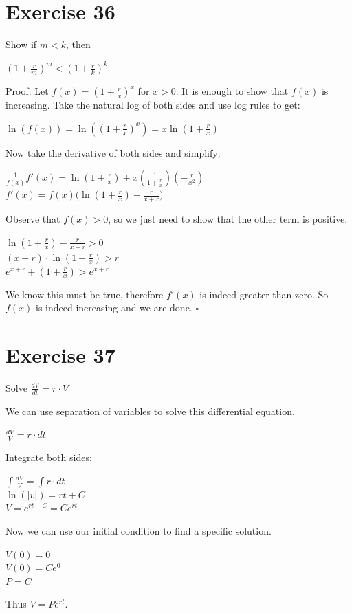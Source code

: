 \documentclass{article}
\begin{document}
\section*{Exercise 36}
Show if $m < k$, then
\begin{center}
    $(1 + \frac{r}{m})^m < (1 + \frac{r}{k})^k$
\end{center}
\begin{flushleft}
    Proof: Let $f(x) = (1 + \frac{r}{x})^x$ for $x > 0$. It is enough to show that $f(x)$ is increasing. Take the natural log of both sides and use log rules to get:
    \begin{center}
        $\ln(f(x)) = \ln((1 + \frac{r}{x})^x) = x\ln(1 + \frac{r}{x})$
    \end{center}
    Now take the derivative of both sides and simplify:
    \begin{center}
        $\frac{1}{f(x)} f'(x) = \ln(1 + \frac{r}{x}) + x(\frac{1}{1+\frac{r}{x}})(-\frac{r}{x^2})$ \\
        $f'(x) = f(x) \big(\ln(1 + \frac{r}{x}) - \frac{r}{x+r}\big)$
    \end{center}
    Observe that $f(x) > 0$, so we just need to show that the other term is positive.
    \begin{center}
        $\ln(1 + \frac{r}{x}) - \frac{r}{x+r} > 0$ \\
        $(x + r) \cdot \ln(1 + \frac{r}{x}) > r$ \\
        $e^{x+r} + (1 + \frac{r}{x}) > e^{x+r}$
    \end{center}
    We know this must be true, therefore $f'(x)$ is indeed greater than zero. So $f(x)$ is indeed increasing and we are done. $\square$
\end{flushleft}

\section*{Exercise 37}
Solve $\frac{dV}{dt} = r \cdot V$
\begin{flushleft}
    We can use separation of variables to solve this differential equation.
    \begin{center}
        $\frac{dV}{V} = r \cdot dt$
    \end{center}
    Integrate both sides:
    \begin{center}
        $\int \frac{dV}{V} = \int r \cdot dt$ \\
        $\ln(|v|) = rt + C$ \\
        $V = e^{rt + C} = Ce^{rt}$
    \end{center}
    Now we can use our initial condition to find a specific solution.
    \begin{center}
        $V(0) = 0$ \\
        $V(0) = Ce^0$ \\
        $P = C$
    \end{center}
    Thus $V = Pe^{rt}$.
\end{flushleft}
\end{document}
